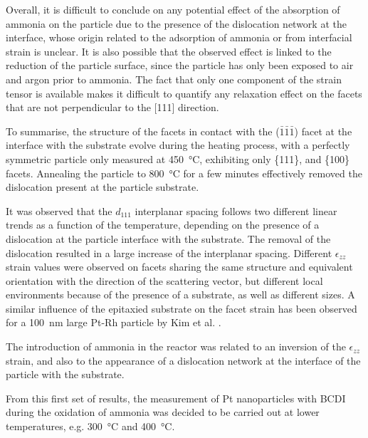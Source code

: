 Overall, it is difficult to conclude on any potential effect of the absorption of ammonia on the particle due to the presence of the dislocation network at the interface, whose origin related to the adsorption of ammonia or from interfacial strain is unclear.
It is also possible that the observed effect is linked to the reduction of the particle surface, since the particle has only been exposed to air and argon prior to ammonia.
The fact that only one component of the strain tensor is available makes it difficult to quantify any relaxation effect on the facets that are not perpendicular to the [111] direction.

To summarise, the structure of the facets in contact with the ($\bar{1}\bar{1}\bar{1}$) facet at the interface with the substrate evolve during the heating process, with a perfectly symmetric particle only measured at \qty{450}{\degreeCelsius}, exhibiting only \{111\}, and \{100\} facets.
Annealing the particle to \qty{800}{\degreeCelsius} for a few minutes effectively removed the dislocation present at the particle substrate.

It was observed that the $d_{111}$ interplanar spacing follows two different linear trends as a function of the temperature, depending on the presence of a dislocation at the particle interface with the substrate.
The removal of the dislocation resulted in a large increase of the interplanar spacing.
Different $\epsilon_{zz}$ strain values were observed on facets sharing the same structure and equivalent orientation with the direction of the scattering vector, but different local environments because of the presence of a substrate, as well as different sizes.
A similar influence of the epitaxied substrate on the facet strain has been observed for a \qty{100}{\nm} large Pt-Rh particle by Kim et al. \parencite*{Kim2021}.

The introduction of ammonia in the reactor was related to an inversion of the $\epsilon_{zz}$ strain, and also to the appearance of a dislocation network at the interface of the particle with the substrate.

From this first set of results, the measurement of Pt nanoparticles with BCDI during the oxidation of ammonia was decided to be carried out at lower temperatures, e.g. \qty{300}{\degreeCelsius} and \qty{400}{\degreeCelsius}.